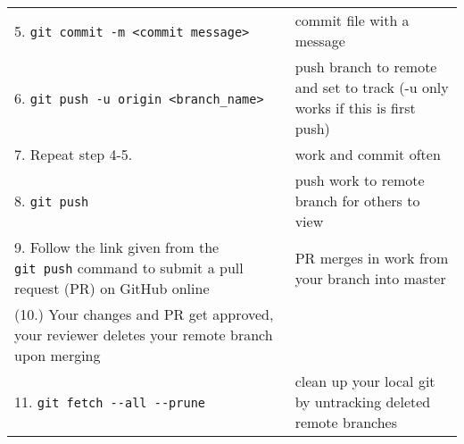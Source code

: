 \documentclass[
]{book}
\begin{document}
\begin{longtable}[]{@{}ll@{}}
\begin{minipage}[t]{0.34\columnwidth}\raggedright
5. \texttt{git\ commit\ -m\ \textless{}commit\ message\textgreater{}}\strut
\end{minipage} & \begin{minipage}[t]{0.60\columnwidth}\raggedright
commit file with a message\strut
\end{minipage}\tabularnewline
\begin{minipage}[t]{0.34\columnwidth}\raggedright
6. \texttt{git\ push\ -u\ origin\ \textless{}branch\_name\textgreater{}}\strut
\end{minipage} & \begin{minipage}[t]{0.60\columnwidth}\raggedright
push branch to remote and set to track (-u only works if this is first push)\strut
\end{minipage}\tabularnewline
\begin{minipage}[t]{0.34\columnwidth}\raggedright
7. Repeat step 4-5.\strut
\end{minipage} & \begin{minipage}[t]{0.60\columnwidth}\raggedright
work and commit often\strut
\end{minipage}\tabularnewline
\begin{minipage}[t]{0.34\columnwidth}\raggedright
8. \texttt{git\ push}\strut
\end{minipage} & \begin{minipage}[t]{0.60\columnwidth}\raggedright
push work to remote branch for others to view\strut
\end{minipage}\tabularnewline
\begin{minipage}[t]{0.34\columnwidth}\raggedright
9. Follow the link given from the \texttt{git\ push} command to submit a pull request (PR) on GitHub online\strut
\end{minipage} & \begin{minipage}[t]{0.60\columnwidth}\raggedright
PR merges in work from your branch into master\strut
\end{minipage}\tabularnewline
\begin{minipage}[t]{0.34\columnwidth}\raggedright
(10.) Your changes and PR get approved, your reviewer deletes your remote branch upon merging\strut
\end{minipage} & \begin{minipage}[t]{0.60\columnwidth}\raggedright
\strut
\end{minipage}\tabularnewline
\begin{minipage}[t]{0.34\columnwidth}\raggedright
11. \texttt{git\ fetch\ -\/-all\ -\/-prune}\strut
\end{minipage} & \begin{minipage}[t]{0.60\columnwidth}\raggedright
clean up your local git by untracking deleted remote branches\strut
\end{minipage}\tabularnewline
\bottomrule
\end{longtable}
\end{document}
